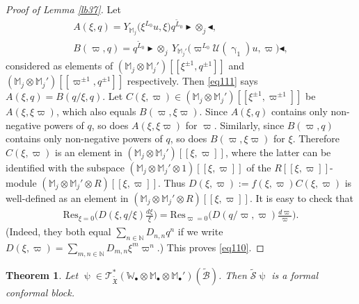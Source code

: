 \documentclass[12pt,a4paper,notitlepage]{report}
\theoremstyle{definition}
\theoremstyle{plain}
\newtheorem{thm}[df]{Theorem}
\newcommand{\fk}{\mathfrak}
\newcommand{\mc}{\mathcal}
\newcommand{\wtd}{\widetilde}
\newcommand{\Res}{\mathrm{Res}}
\newcommand{\scr}{\mathscr}
\newcommand{\blt}{\bullet}
\newcommand{\Wbb}{\mathbb W}
\newcommand{\Mbb}{\mathbb M}
\newcommand{\Nbb}{\mathbb N}
\newcommand{\btl}{\blacktriangleleft}
\newcommand{\btr}{\blacktriangleright}
\numberwithin{equation}{section}
\begin{document}
\begin{proof}[Proof of Lemma \ref{lb37}]
Let 
\begin{gather*}
A(\xi,q)=Y_{\Mbb_j}\big(\xi^{L_0}u,\xi\big)q^{\wtd L_0}\btr\otimes_j\btl,\\
B(\varpi,q)=q^{\wtd L_0}\btr\otimes_j~Y_{\Mbb_j'}\big(\varpi^{L_0}\mc U(\upgamma_1)u,\varpi\big)\btl,
\end{gather*}
considered as elements of $(\Mbb_j\otimes\Mbb_j')[[\xi^{\pm1},q^{\pm 1}]]$ and $(\Mbb_j\otimes\Mbb_j')[[\varpi^{\pm1},q^{\pm 1}]]$ respectively. Then \eqref{eq111} says $A(\xi,q)=B(q/\xi,q)$. Let $C(\xi,\varpi)\in(\Mbb_j\otimes\Mbb_j')[[\xi^{\pm 1},\varpi^{\pm1}]]$  be $A(\xi,\xi\varpi)$, which also equals $B(\varpi,\xi\varpi)$. Since $A(\xi,q)$ contains only non-negative  powers of $q$, so does $A(\xi,\xi\varpi)$ for $\varpi$.   Similarly, since $B(\varpi,q)$ contains only non-negative powers of $q$, so does $B(\varpi,\xi\varpi)$ for $\xi$. Therefore $C(\xi,\varpi)$ is an element in  $(\Mbb_j\otimes\Mbb_j')[[\xi,\varpi]]$, where the latter  can be identified with the subspace $(\Mbb_j\otimes\Mbb_j'\otimes 1)[[\xi,\varpi]]$ of the $R[[\xi,\varpi]]$-module $(\Mbb_j\otimes\Mbb_j'\otimes R)[[\xi,\varpi]]$. Thus $D(\xi,\varpi):=f(\xi,\varpi)C(\xi,\varpi)$ is well-defined as an element in $(\Mbb_j\otimes\Mbb_j'\otimes R)[[\xi,\varpi]]$. It is easy to check that
\begin{align*}
\Res_{\xi=0}\bigg(D(\xi,q/\xi)\frac{d\xi}{\xi}\bigg)=\Res_{\varpi=0}\bigg(D(q/\varpi,\varpi)\frac{d\varpi}{\varpi}\bigg).
\end{align*}
(Indeed, they both equal $\sum_{n\in\Nbb}D_{n,n}q^n$ if we write $D(\xi,\varpi)=\sum_{m,n\in\Nbb}D_{m,n}\xi^m\varpi^n$.) This proves \eqref{eq110}.
\end{proof}



\begin{thm}\label{lb42}
Let $\uppsi\in\scr T_{\wtd{\fk X}}^*(\Wbb_\blt\otimes\Mbb_\blt\otimes\Mbb_\blt')(\wtd{\mc B})$. Then $\wtd{\mc S}\uppsi$ is a formal conformal block.
\end{thm}
\end{document}
